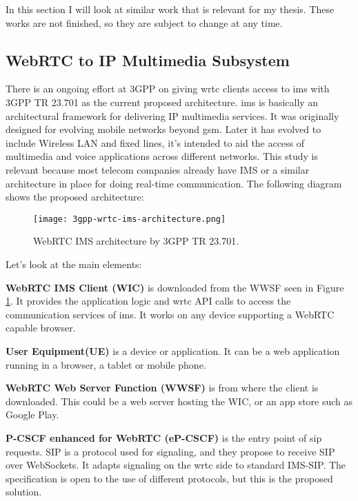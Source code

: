 In this section I will look at similar work that is relevant for my thesis. These works are not finished, so they are subject to change at any time.

\subsection{WebRTC to IP Multimedia Subsystem}
\label{sec:webrtc-ims}
There is an ongoing effort at 3GPP on giving \gls{wrtc} clients access to \gls{ims} with 3GPP TR 23.701\cite{3gpp-wrtc-access-ims} as the current proposed architecture. \gls{ims} is basically an architectural framework for delivering IP multimedia services. It was originally designed for evolving mobile networks beyond \gls{gsm}. Later it has evolved to include Wireless LAN and fixed lines, it's intended to aid the access of multimedia and voice applications across different networks. This study is relevant because most telecom companies already have IMS or a similar architecture in place for doing real-time communication. The following diagram shows the proposed architecture:

\begin{figure}[here]
\centerline{\texttt{[image: 3gpp-wrtc-ims-architecture.png]}}
\caption{WebRTC IMS architecture by 3GPP TR 23.701.}
\label{fig:wrtc-ims-architecture}
\end{figure}

Let's look at the main elements:

\textbf{WebRTC IMS Client (WIC)}
is downloaded from the WWSF seen in Figure \ref{fig:wrtc-ims-architecture}. It provides the application logic and \gls{wrtc} API calls to access the communication services of \gls{ims}. It works on any device supporting a WebRTC capable browser.

\textbf{User Equipment(UE)}
is a device or application. It can be a web application running in a browser, a tablet or mobile phone.

\textbf{WebRTC Web Server Function (WWSF)}
is from where the client is downloaded. This could be a web server hosting the WIC, or an app store such as Google Play.

\textbf{P-CSCF enhanced for WebRTC (eP-CSCF)}
is the entry point of \gls{sip} requests. SIP is a protocol used for signaling, and they propose to receive SIP over WebSockets. It adapts signaling on the \gls{wrtc} side to standard IMS-SIP. The specification is open to the use of different protocols, but this is the proposed solution.


